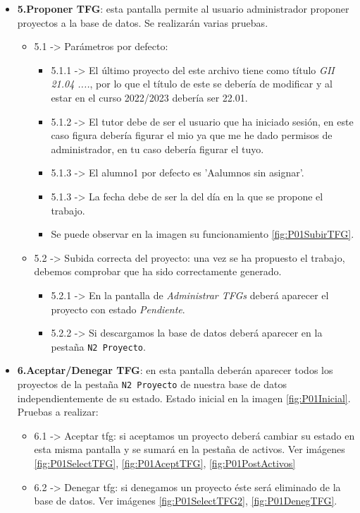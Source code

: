\begin{itemize}
	
	\item \textbf{5.Proponer TFG}: esta pantalla permite al usuario administrador proponer proyectos a la base de datos. Se realizarán varias pruebas.
			\begin{itemize}
				\item 5.1 -> Parámetros por defecto: 
					\begin{itemize}
				 		\item 5.1.1 -> El último proyecto del este archivo tiene como título \emph{GII 21.04 ....}, por lo que el título de este se debería de modificar y al estar en el curso 2022/2023 debería ser 22.01.
				 		\item 5.1.2 -> El tutor debe de ser el usuario que ha iniciado sesión, en este caso figura debería figurar el mio ya que me he dado permisos de administrador, en tu caso debería figurar el tuyo.
				 		\item 5.1.3 -> El alumno1 por defecto es 'Aalumnos sin asignar'.
				 		\item 5.1.3 -> La fecha debe de ser la del día en la que se propone el trabajo.
				 		\item Se puede observar en la imagen su funcionamiento \ref{fig:P01SubirTFG}.
					\end{itemize}
				\item 5.2 -> Subida correcta del proyecto: una vez se ha propuesto el trabajo, debemos comprobar que ha sido correctamente generado.
					\begin{itemize}
						\item 5.2.1 -> En la pantalla de \emph{Administrar TFGs} deberá aparecer el proyecto con estado \emph{Pendiente}.
						\item 5.2.2 -> Si descargamos la base de datos deberá aparecer en la pestaña \texttt{N2 Proyecto}.						
					\end{itemize}				
			\end{itemize}

	
	\item \textbf{6.Aceptar/Denegar TFG}: en esta pantalla deberán aparecer todos los proyectos de la pestaña \texttt{N2 Proyecto} de nuestra base de datos independientemente de su estado. Estado inicial en la imagen \ref{fig:P01Inicial}. Pruebas a realizar:
		\begin{itemize}
			\item 6.1 -> Aceptar tfg: si aceptamos un proyecto deberá cambiar su estado en esta misma pantalla y se sumará en la pestaña de activos. Ver imágenes \ref{fig:P01SelectTFG},  \ref{fig:P01AceptTFG}, \ref{fig:P01PostActivos}
			\item 6.2 -> Denegar tfg: si denegamos un proyecto éste será eliminado de la base de datos. Ver imágenes \ref{fig:P01SelectTFG2},
			\ref{fig:P01DenegTFG}.
		\end{itemize}


\end{itemize}
